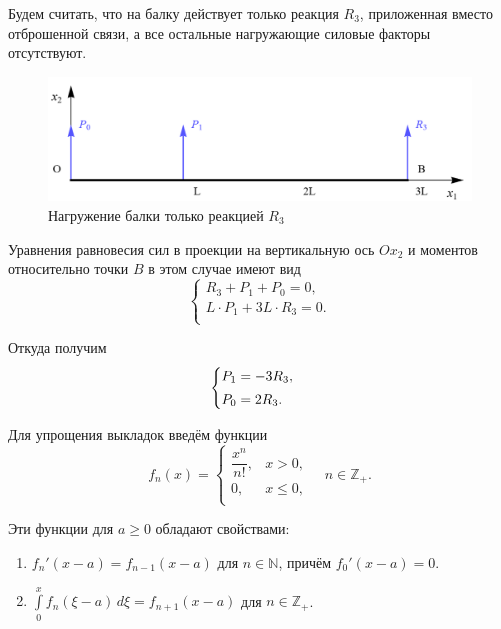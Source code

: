 \documentclass[12pt, a4paper]{article}
\begin{document}
	Будем считать, что на балку действует только реакция $R_3$, приложенная вместо отброшенной связи, а все остальные нагружающие силовые факторы отсутствуют.
	
	\begin{figure}[!h]
		\centering
		\includegraphics[width=0.75\linewidth]{plot-4}
		\caption{Нагружение балки только реакцией $R_3$}
	\end{figure}
	
	Уравнения равновесия сил в проекции на вертикальную ось $Ox_2$ и моментов относительно точки $B$ в этом случае имеют вид
	\vspace{-0.5em}
	\begin{equation*}
		\begin{cases}
			R_3 + P_1 + P_0 = 0, \\ 
			L \cdot P_1 + 3L \cdot R_3 = 0. \\
		\end{cases}
	\end{equation*}
	
	Откуда получим
	\begin{equation}
		\begin{cases} \vspace{0.25em}
			P_1 = - 3 R_3, \\ 
			P_0 = 2 R_3. \\
		\end{cases}
		\label{eqP0P1R}
	\end{equation}
	
	Для упрощения выкладок введём функции
	\[
	f_n(x) = 
	\begin{cases}
		\dfrac{x^n}{n!}, & x > 0, \\ 
		0, & x \leq 0, \\
	\end{cases}
	\quad n \in \mathbb{Z}_+.
	\]
	
	\newpage
	
	Эти функции для $a \geq 0$ обладают свойствами:
	\begin{enumerate}
		\item $f_n'(x - a) = f_{n-1}(x - a)$ для $n \in \mathbb{N}$, причём $f_0'(x - a) = 0$.
		
		\vspace{0.25em}
		
		\item $\int\limits_0^{x} f_n(\xi - a) \, d \xi = f_{n+1}(x - a)$ для $n \in \mathbb{Z}_+$.
	\end{enumerate}
	
\end{document}

